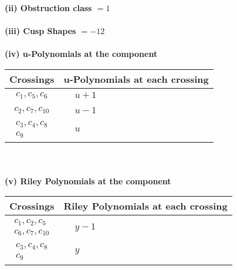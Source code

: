 \documentclass[1p]{elsarticle_modified}
\theoremstyle{definition}
\begin{document}
\flushleft \textbf{(ii) Obstruction class $= 1$}\\~\\
\flushleft \textbf{(iii) Cusp Shapes $= -12$}\\~\\
\newpage\renewcommand{\arraystretch}{1}
\flushleft \textbf{(iv) u-Polynomials at the component}\newline \\
\begin{tabular}{m{50pt}|m{274pt}}
Crossings & \hspace{64pt}u-Polynomials at each crossing \\
\hline $$\begin{aligned}c_{1},c_{5},c_{6}\end{aligned}$$&$\begin{aligned}
&u+1
\end{aligned}$\\
\hline $$\begin{aligned}c_{2},c_{7},c_{10}\end{aligned}$$&$\begin{aligned}
&u-1
\end{aligned}$\\
\hline $$\begin{aligned}c_{3},c_{4},c_{8}\\c_{9}\end{aligned}$$&$\begin{aligned}
&u
\end{aligned}$\\
\hline
\end{tabular}\\~\\
\newpage\renewcommand{\arraystretch}{1}
\flushleft \textbf{(v) Riley Polynomials at the component}\newline \\
\begin{tabular}{m{50pt}|m{274pt}}
Crossings & \hspace{64pt}Riley Polynomials at each crossing \\
\hline $$\begin{aligned}c_{1},c_{2},c_{5}\\c_{6},c_{7},c_{10}\end{aligned}$$&$\begin{aligned}
&y-1
\end{aligned}$\\
\hline $$\begin{aligned}c_{3},c_{4},c_{8}\\c_{9}\end{aligned}$$&$\begin{aligned}
&y
\end{aligned}$\\
\hline
\end{tabular}\\~\\
\end{document}
